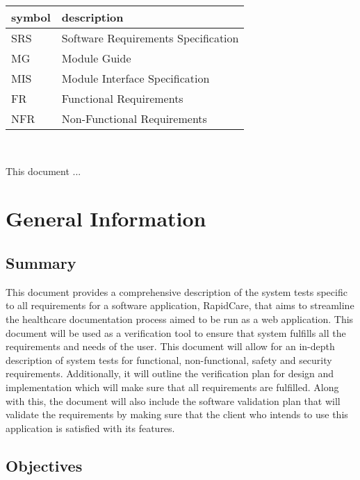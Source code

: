 \documentclass[12pt, titlepage]{article}
\begin{document}
\renewcommand{\arraystretch}{1.2}
\begin{tabular}{l l} 
  \toprule		
  \textbf{symbol} & \textbf{description}\\
  \midrule 
  SRS & Software Requirements Specification\\
  MG & Module Guide\\
  MIS & Module Interface Specification\\
  FR & Functional Requirements\\
  NFR & Non-Functional Requirements\\
  \bottomrule
\end{tabular}\\



\newpage


This document ... 

\section{General Information}

\subsection{Summary}

This document provides a comprehensive description of the system tests specific to all requirements for a software application, RapidCare, that aims to streamline the healthcare documentation process aimed to be run as a web application. This document will be used as a verification tool to ensure that system fulfills all the requirements and needs of the user. This document will allow for an in-depth description of system tests for functional, non-functional, safety and security requirements. Additionally, it will outline the verification plan for design and implementation which will make sure that all requirements are fulfilled. Along with this, the document will also include the software validation plan that will validate the requirements by making sure that the client who intends to use this application is satisfied with its features.    

\subsection{Objectives}
\end{document}
